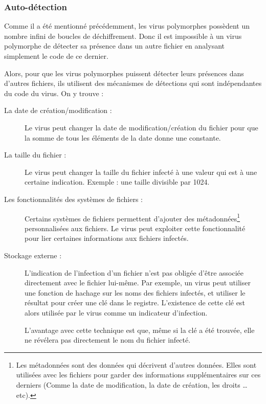         \subsubsection{Auto-détection}
        Comme il a été mentionné précédemment, les virus polymorphes possèdent un nombre infini de boucles de 
        déchiffrement. Donc il est impossible à un virus polymorphe de détecter sa présence dans un autre fichier en 
        analysant simplement le code de ce dernier. %

        Alors, pour que les virus polymorphes puissent détecter leurs présences dans d'autres fichiers, ils utilisent
        des mécanismes de détections qui sont indépendantes du code du virus. On y trouve : \cite{virus} %
        \begin{description}
            \item[La date de création/modification :] Le virus peut changer la date de modification/création
                du fichier pour que la somme de tous les éléments de la date donne une constante. %

            \item[La taille du fichier :] Le virus peut changer la taille du fichier infecté à une valeur qui est 
                à une certaine indication. Exemple : une taille divisible par 1024. %

            \item[Les fonctionnalités des systèmes de fichiers :] Certains systèmes de fichiers permettent
                d'ajouter des métadonnées\footnote{
                Les métadonnées sont des données qui décrivent d'autres données. 
                Elles sont utilisées avec les fichiers pour garder des informations supplémentaires sur ces derniers 
                (Comme la date de modification, la date de création, les droits \ldots{} etc).} 
                personnalisées aux fichiers. Le virus peut exploiter cette fonctionnalité pour lier 
                certaines informations aux fichiers infectés. %

            \item[Stockage externe :] L'indication de l'infection d'un fichier n'est pas obligée d'être associée
                directement avec le fichier lui-même. Par exemple, un virus peut utiliser une fonction de hachage 
                sur les noms des fichiers infectés, et utiliser le résultat pour créer une clé dans le registre.
                L'existence de cette clé est alors utilisée par le virus comme un indicateur d'infection. %

                L'avantage avec cette technique est que, même si la clé a été trouvée, elle ne révélera pas directement 
                le nom du fichier infecté. %

            \end{description}


